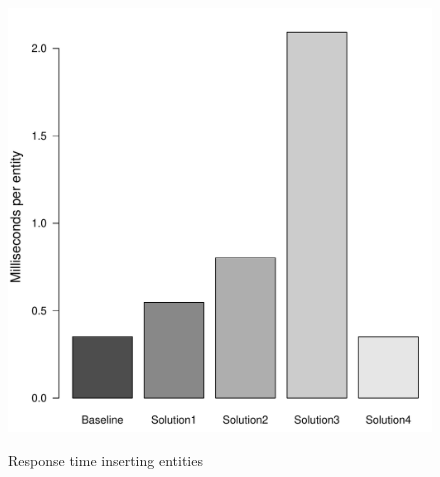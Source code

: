 \begin{landscape}
\begin{figure}
			{\includegraphics[width=\W]{figure/result/barplot-insert_course-rt.pdf}}
			\caption{Response time inserting entities}\label{fre:insert-response-time}
			

\end{figure}
\end{landscape}
